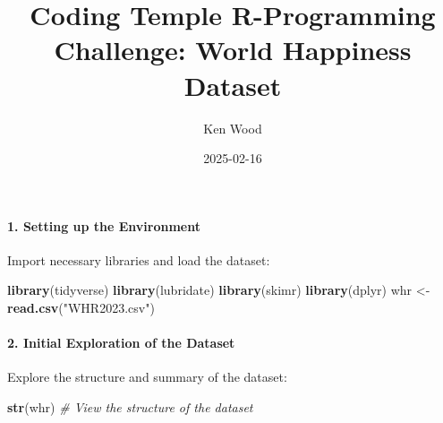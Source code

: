 \documentclass[
]{article}
\title{Coding Temple R-Programming Challenge: World Happiness Dataset}
\author{Ken Wood}
\date{2025-02-16}
\newenvironment{Shaded}{\begin{snugshade}}{\end{snugshade}}
\newcommand{\CommentTok}[1]{\textcolor[rgb]{0.56,0.35,0.01}{\textit{#1}}}
\newcommand{\FunctionTok}[1]{\textcolor[rgb]{0.13,0.29,0.53}{\textbf{#1}}}
\newcommand{\NormalTok}[1]{#1}
\newcommand{\OtherTok}[1]{\textcolor[rgb]{0.56,0.35,0.01}{#1}}
\newcommand{\StringTok}[1]{\textcolor[rgb]{0.31,0.60,0.02}{#1}}
\begin{document}
\maketitle

\paragraph{1. Setting up the
Environment}\label{setting-up-the-environment}

Import necessary libraries and load the dataset:

\begin{Shaded}
\begin{Highlighting}[]
\FunctionTok{library}\NormalTok{(tidyverse)}
\FunctionTok{library}\NormalTok{(lubridate)}
\FunctionTok{library}\NormalTok{(skimr)}
\FunctionTok{library}\NormalTok{(dplyr)}
\NormalTok{whr }\OtherTok{\textless{}{-}} \FunctionTok{read.csv}\NormalTok{(}\StringTok{"WHR2023.csv"}\NormalTok{)}
\end{Highlighting}
\end{Shaded}

\paragraph{2. Initial Exploration of the
Dataset}\label{initial-exploration-of-the-dataset}

Explore the structure and summary of the dataset:

\begin{Shaded}
\begin{Highlighting}[]
\FunctionTok{str}\NormalTok{(whr)  }\CommentTok{\# View the structure of the dataset}
\end{Highlighting}
\end{Shaded}
\end{document}
